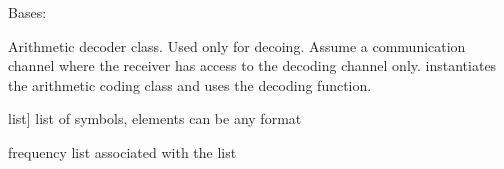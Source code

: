 \documentclass[letterpaper,10pt,english]{sphinxmanual}
\begin{document}
\begin{fulllineitems}
\label{\detokenize{arithmetic_coding:arithmetic_coding.ArithmeticDecoder}}
\pysigstartsignatures
{}
\pysigstopsignatures
\sphinxAtStartPar
Bases: {\hyperref[\detokenize{core:core.data.Data}]{}}

\sphinxAtStartPar
Arithmetic decoder class. Used only for decoing. Assume a communication channel where the receiver has access to the decoding channel only. instantiates the arithmetic coding class and uses the decoding function.
\begin{description}
\begin{description}
\sphinxlineitem{symbols}{[}list{]}
\sphinxAtStartPar
list of symbols, elements can be any format

\sphinxAtStartPar
frequency list associated with the list

\end{description}

\end{description}

\begin{sphinxVerbatim}[commandchars=\\\{\}]
  \PYG{p}{[}  \PYG{p}{]}
  \PYG{p}{[}  \PYG{p}{]}
   
\end{sphinxVerbatim}


\end{fulllineitems}
\end{document}
